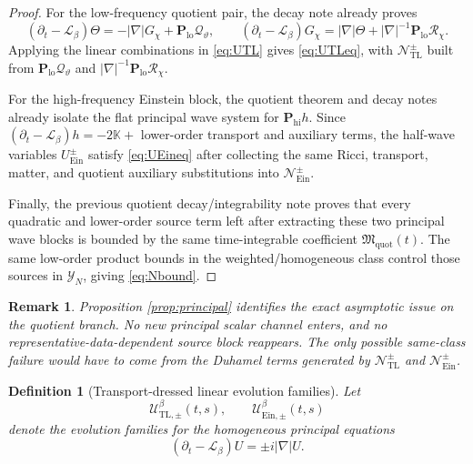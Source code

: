 \documentclass[11pt]{article}
\newcommand{\Ell}{\mathcal{L}}
\newtheorem{definition}{Definition}
\newtheorem{remark}{Remark}
\begin{document}
\begin{proof}
For the low-frequency quotient pair, the decay note already proves
\[
(\partial_t-\Ell_\beta)\Theta
=
-|\nabla|G_\chi+\mathbf P_{\mathrm{lo}}\mathcal Q_\vartheta,
\qquad
(\partial_t-\Ell_\beta)G_\chi
=
|\nabla|\Theta+|\nabla|^{-1}\mathbf P_{\mathrm{lo}}\mathcal R_\chi.
\]
Applying the linear combinations in \eqref{eq:UTL} gives \eqref{eq:UTLeq}, with \(\mathcal N_{\mathrm{TL}}^\pm\) built from \(\mathbf P_{\mathrm{lo}}\mathcal Q_\vartheta\) and \(|\nabla|^{-1}\mathbf P_{\mathrm{lo}}\mathcal R_\chi\).

For the high-frequency Einstein block, the quotient theorem and decay notes already isolate the flat principal wave system for \(\mathbf P_{\mathrm{hi}}h\). Since \((\partial_t-\Ell_\beta)h=-2\mathbb K+\) lower-order transport and auxiliary terms, the half-wave variables \(U_{\mathrm{Ein}}^\pm\) satisfy \eqref{eq:UEineq} after collecting the same Ricci, transport, matter, and quotient auxiliary substitutions into \(\mathcal N_{\mathrm{Ein}}^\pm\).

Finally, the previous quotient decay/integrability note proves that every quadratic and lower-order source term left after extracting these two principal wave blocks is bounded by the same time-integrable coefficient \(\mathfrak M_{\mathrm{quot}}(t)\). The same low-order product bounds in the weighted/homogeneous class control those sources in \(\mathcal Y_N\), giving \eqref{eq:Nbound}.
\end{proof}

\begin{remark}
Proposition \ref{prop:principal} identifies the exact asymptotic issue on the quotient branch. No new principal scalar channel enters, and no representative-data-dependent source block reappears. The only possible same-class failure would have to come from the Duhamel terms generated by \(\mathcal N_{\mathrm{TL}}^\pm\) and \(\mathcal N_{\mathrm{Ein}}^\pm\).
\end{remark}

\begin{definition}[Transport-dressed linear evolution families]
\label{def:families}
Let
\[
\mathcal U_{\mathrm{TL},\pm}^\beta(t,s),
\qquad
\mathcal U_{\mathrm{Ein},\pm}^\beta(t,s)
\]
denote the evolution families for the homogeneous principal equations
\begin{equation}
(\partial_t-\Ell_\beta)U=\pm i|\nabla|U.
\label{eq:wavefamily}
\end{equation}
\end{definition}
\end{document}
